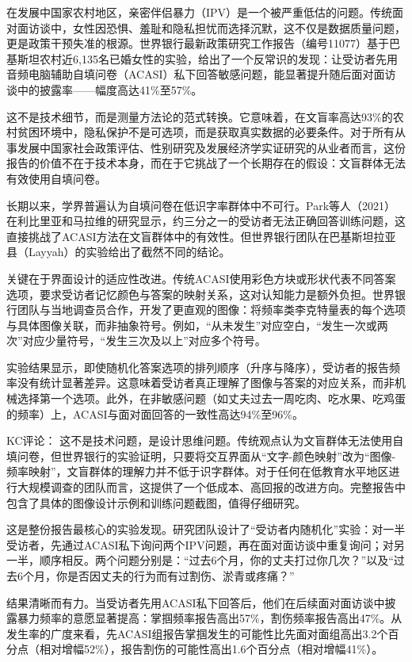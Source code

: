 \documentclass[11pt]{ctexart}
\begin{document}
在发展中国家农村地区，亲密伴侣暴力（IPV）是一个被严重低估的问题。传统面对面访谈中，女性因恐惧、羞耻和隐私担忧而选择沉默，这不仅是数据质量问题，更是政策干预失准的根源。世界银行最新政策研究工作报告（编号11077）基于巴基斯坦农村近6,135名已婚女性的实验，给出了一个反常识的发现：让受访者先用音频电脑辅助自填问卷（ACASI）私下回答敏感问题，能显著提升随后面对面访谈中的披露率——幅度高达41\%至57\%。

这不是技术细节，而是测量方法论的范式转换。它意味着，在文盲率高达93\%的农村贫困环境中，隐私保护不是可选项，而是获取真实数据的必要条件。对于所有从事发展中国家社会政策评估、性别研究及发展经济学实证研究的从业者而言，这份报告的价值不在于技术本身，而在于它挑战了一个长期存在的假设：文盲群体无法有效使用自填问卷。

长期以来，学界普遍认为自填问卷在低识字率群体中不可行。Park等人（2021）在利比里亚和马拉维的研究显示，约三分之一的受访者无法正确回答训练问题，这直接挑战了ACASI方法在文盲群体中的有效性。但世界银行团队在巴基斯坦拉亚县（Layyah）的实验给出了截然不同的结论。

关键在于界面设计的适应性改进。传统ACASI使用彩色方块或形状代表不同答案选项，要求受访者记忆颜色与答案的映射关系，这对认知能力是额外负担。世界银行团队与当地调查员合作，开发了更直观的图像：将频率类李克特量表的每个选项与具体图像关联，而非抽象符号。例如，“从未发生”对应空白，“发生一次或两次”对应少量符号，“发生三次及以上”对应多个符号。

实验结果显示，即使随机化答案选项的排列顺序（升序与降序），受访者的报告频率没有统计显著差异。这意味着受访者真正理解了图像与答案的对应关系，而非机械选择第一个选项。此外，在非敏感问题（如丈夫过去一周吃肉、吃水果、吃鸡蛋的频率）上，ACASI与面对面回答的一致性高达94\%至96\%。

KC评论： 这不是技术问题，是设计思维问题。传统观点认为文盲群体无法使用自填问卷，但世界银行的实验证明，只要将交互界面从“文字-颜色映射”改为“图像-频率映射”，文盲群体的理解力并不低于识字群体。对于任何在低教育水平地区进行大规模调查的团队而言，这提供了一个低成本、高回报的改进方向。完整报告中包含了具体的图像设计示例和训练问题截图，值得仔细研究。

这是整份报告最核心的实验发现。研究团队设计了“受访者内随机化”实验：对一半受访者，先通过ACASI私下询问两个IPV问题，再在面对面访谈中重复询问；对另一半，顺序相反。两个问题分别是：“过去6个月，你的丈夫打过你几次？”以及“过去6个月，你是否因丈夫的行为而有过割伤、淤青或疼痛？”

结果清晰而有力。当受访者先用ACASI私下回答后，他们在后续面对面访谈中披露暴力频率的意愿显著提高：掌掴频率报告高出57\%，割伤频率报告高出47\%。从发生率的广度来看，先ACASI组报告掌掴发生的可能性比先面对面组高出3.2个百分点（相对增幅52\%），报告割伤的可能性高出1.6个百分点（相对增幅41\%）。
\end{document}
